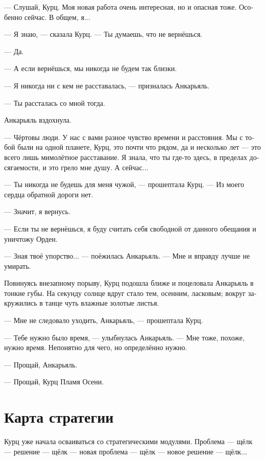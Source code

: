 \documentclass[a4paper,12pt,fleqn]{book}\usepackage{polyglossia}\setdefaultlanguage[babelshorthands=true]{russian}\setotherlanguage{english}\defaultfontfeatures{Ligatures=TeX,Mapping=tex-text}\usepackage{xcolor}\newcommand{\ml}[3]{#2}
\begin{document}
--- Слушай, Курц.
Моя новая работа очень интересная, но и опасная тоже.
Особенно сейчас.
В общем, я...

--- Я знаю, --- сказала Курц.
--- Ты думаешь, что не вернёшься.

--- Да.

\ml{$0$}
{--- А если вернёшься, мы никогда не будем так близки.}
{``And even if you come back, we'll never be as close as we are now.''}

--- Я никогда ни с кем не расставалась, --- призналась Анкарьяль.

--- Ты рассталась со мной тогда.

Анкарьяль вздохнула.

--- Чёртовы люди.
У нас с вами разное чувство времени и расстояния.
Мы с тобой были на одной планете, Курц, это почти что рядом, да и несколько лет --- это всего лишь мимолётное расставание.
Я знала, что ты где-то здесь, в пределах досягаемости, и это грело мне душу.
А сейчас...

--- Ты никогда не будешь для меня чужой, --- прошептала Курц.
\ml{$0$}
{--- Из моего сердца обратной дороги нет.}
{``There's no way back from my heart.''}

--- Значит, я вернусь.

--- Если ты не вернёшься, я буду считать себя свободной от данного обещания и уничтожу Орден.

--- Зная твоё упорство... --- поёжилась Анкарьяль.
--- Мне и вправду лучше не умирать.

Повинуясь внезапному порыву, Курц подошла ближе и поцеловала Анкарьяль в тонкие губы.
На секунду солнце вдруг стало тем, осенним, ласковым;
вокруг закружились в танце чуть влажные золотые листья.

--- Мне не следовало уходить, Анкарьяль, --- прошептала Курц.

--- Тебе нужно было время, --- улыбнулась Анкарьяль.
--- Мне тоже, похоже, нужно время.
Непонятно для чего, но определённо нужно.

--- Прощай, Анкарьяль.

--- Прощай, Курц Пламя Осени.

\section{Карта стратегии}

Курц уже начала осваиваться со стратегическими модулями.
Проблема --- щёлк --- решение --- щёлк --- новая проблема --- щёлк --- новое решение --- щёлк...
\end{document}
